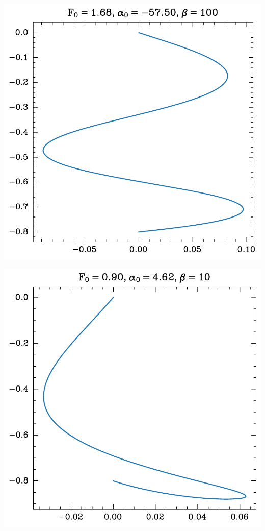 \begin{center}
    \begin{minipage}{0.5\textwidth}
        \centering
    \includegraphics[width=\textwidth]{../images/2024-1-trajektorija3.pdf}
    \end{minipage}\hfill
    \begin{minipage}{0.5\textwidth}
        \centering
        \includegraphics[width=1\textwidth]{../images/2024-1-trajektorija8.pdf}
    \end{minipage}
\end{center}
